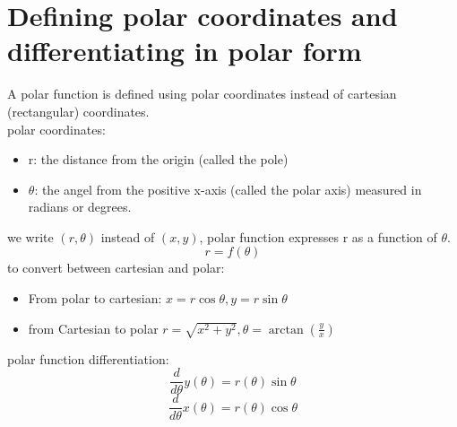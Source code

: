 \documentclass{article}
\begin{document}
                \section{Defining polar coordinates and differentiating in polar form}
                    A polar function is defined using polar coordinates instead of cartesian (rectangular) coordinates.\\
                    polar coordinates: 
                    \begin{itemize}
                        \item r: the distance from the origin (called the pole)
                        \item \(\theta\): the angel from the positive x-axis (called the polar axis) measured in radians or degrees.
                    \end{itemize}
                     we write \((r, \theta)\) instead of \((x, y)\), polar function expresses r as a function of \(\theta\).
                     \[r = f(\theta)\] 
                     to convert between cartesian and polar: 
                     \begin{itemize}
                        \item  From polar to cartesian: \(x = r \cos{\theta}, y = r \sin{\theta}\)
                        \item from Cartesian to polar \(r = \sqrt{x^2 + y^2}, \theta = \arctan (\frac{y}{x})\)
                     \end{itemize}
                     polar function differentiation: 
                    \[\frac{d}{d\theta} y(\theta) = r(\theta)\sin{\theta}\]
                    \[\frac{d}{d\theta} x(\theta) = r(\theta)\cos{\theta}\]


                    
                    
                
\end{document}
